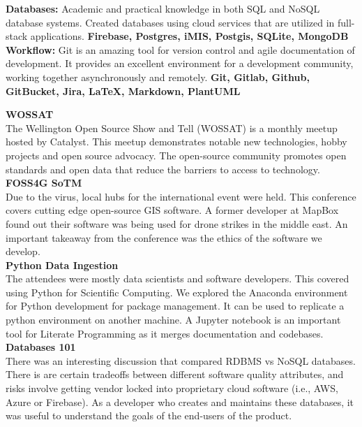 \documentclass[9pt]{developercv}
\begin{document}
\textbf{Databases:} Academic and practical knowledge in both SQL and NoSQL database systems. Created databases using cloud services that are utilized in full-stack applications. \textbf{Firebase, Postgres, iMIS, Postgis, SQLite, MongoDB} \\

\textbf{Workflow:} Git is an amazing tool for version control and agile documentation of development. It provides an excellent environment for a development community, working together asynchronously and remotely. \textbf{Git, Gitlab, Github, GitBucket, Jira, LaTeX, Markdown, PlantUML} \\

\newpage
{}

\textbf{WOSSAT} \\ 
The Wellington Open Source Show and Tell (WOSSAT) is a monthly meetup hosted by Catalyst. This meetup demonstrates notable new technologies, hobby projects and open source advocacy. The open-source community promotes open standards and open data that reduce the barriers to access to technology. \\

\textbf{FOSS4G SoTM} \\
Due to the virus, local hubs for the international event were held. This conference covers cutting edge open-source GIS software. A former developer at MapBox found out their software was being used for drone strikes in the middle east. An important takeaway from the conference was the ethics of the software we develop. \\

\textbf{Python Data Ingestion} \\
The attendees were mostly data scientists and software developers. This covered using Python for Scientific Computing. We explored the Anaconda environment for Python development for package management. It can be used to replicate a python environment on another machine. A Jupyter notebook is an important tool for Literate Programming as it merges documentation and codebases. \\

\textbf{Databases 101} \\
There was an interesting discussion that compared RDBMS vs NoSQL databases. There is are certain tradeoffs between different software quality attributes, and risks involve getting vendor locked into proprietary cloud software (i.e., AWS, Azure or Firebase). As a developer who creates and maintains these databases, it was useful to understand the goals of the end-users of the product.
\end{document}
